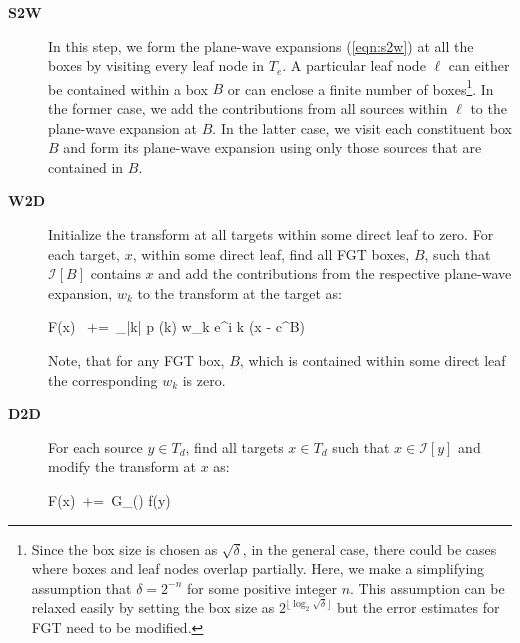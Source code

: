 \begin{description}

\item[\textbf{S2W}] In this step, we form the plane-wave expansions (\ref{eqn:s2w}) at all the boxes by visiting 
every leaf node in $T_e$. A particular leaf node $\ell$ can either be contained within a box $B$ or can enclose a
finite number of boxes\footnote{Since the box size is chosen as $\sqrt{\delta}$, in the general case, there could be cases where boxes and
leaf nodes overlap partially. Here, we make a simplifying assumption that $\delta = 2^{-n}$ for some positive 
integer $n$. This assumption can be relaxed easily by setting the box size as $2^{\lfloor \log_2 \sqrt{\delta} \rfloor}$ but
the error estimates for FGT need to be modified.}. In the former case, we add the contributions from all sources
within $\ell$ to the plane-wave expansion at $B$. In the latter case, we visit each constituent box $B$ and form 
its plane-wave expansion using only those sources that are contained in $B$.

\item[\textbf{W2D}] Initialize the transform at all targets within some direct leaf to zero. For
 each target, $x$, within some direct leaf, find all FGT boxes, $B$, such that $\mathcal{I}[B]$ contains $x$ and
 add the contributions from the respective plane-wave expansion, $w_k$ to the transform at the target as: 

\beq F(x) \, +=\, \sum_{|k| \leq p} (k)  w_k e^{i \lambda k \cdot (x - c^B)} \label{eqn:w2d} \eeq

Note, that for any FGT box, $B$, which is contained within some direct leaf the corresponding $w_k$ is zero.

\item[\textbf{D2D}] For each source $y \in T_d$, find all targets $x \in T_d$ such that $x \in \mathcal{I}[y]$ and
 modify the transform at $x$ as:
  
\beq F(x) \,+=\, G_\delta() f(y) \label{eqn:d2d} \eeq


\end{description}
